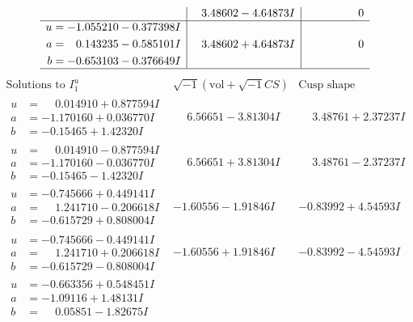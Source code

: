 \documentclass[1p]{elsarticle_modified}
\theoremstyle{definition}
\newcommand{\I}{\sqrt{-1}}
\begin{document}
$$\begin{array}{c|c|c}
 & \phantom{-}3.48602 - 4.64873 I & \phantom{-0.000000 } 0 \\ \hline\begin{aligned}
u &= -1.055210 - 0.377398 I \\
a &= \phantom{-}0.143235 - 0.585101 I \\
b &= -0.653103 - 0.376649 I\end{aligned}
 & \phantom{-}3.48602 + 4.64873 I & \phantom{-0.000000 } 0\\
 \hline 
 \end{array}$$\newpage$$\begin{array}{c|c|c}  
\text{Solutions to }I^u_{1}& \I (\text{vol} + \sqrt{-1}CS) & \text{Cusp shape}\\
 \hline 
\begin{aligned}
u &= \phantom{-}0.014910 + 0.877594 I \\
a &= -1.170160 + 0.036770 I \\
b &= -0.15465 + 1.42320 I\end{aligned}
 & \phantom{-}6.56651 - 3.81304 I & \phantom{-}3.48761 + 2.37237 I \\ \hline\begin{aligned}
u &= \phantom{-}0.014910 - 0.877594 I \\
a &= -1.170160 - 0.036770 I \\
b &= -0.15465 - 1.42320 I\end{aligned}
 & \phantom{-}6.56651 + 3.81304 I & \phantom{-}3.48761 - 2.37237 I \\ \hline\begin{aligned}
u &= -0.745666 + 0.449141 I \\
a &= \phantom{-}1.241710 - 0.206618 I \\
b &= -0.615729 + 0.808004 I\end{aligned}
 & -1.60556 - 1.91846 I & -0.83992 + 4.54593 I \\ \hline\begin{aligned}
u &= -0.745666 - 0.449141 I \\
a &= \phantom{-}1.241710 + 0.206618 I \\
b &= -0.615729 - 0.808004 I\end{aligned}
 & -1.60556 + 1.91846 I & -0.83992 - 4.54593 I \\ \hline\begin{aligned}
u &= -0.663356 + 0.548451 I \\
a &= -1.09116 + 1.48131 I \\
b &= \phantom{-}0.05851 - 1.82675 I\end{aligned}

\end{array}$$
\end{document}
